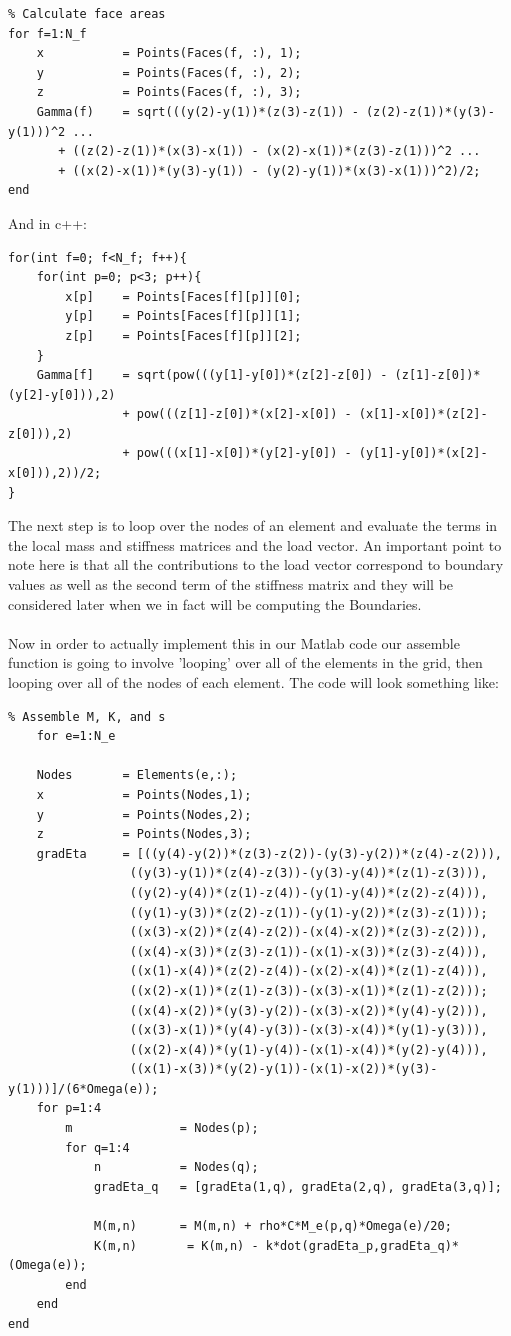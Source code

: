 \documentclass[12pt]{article}
\begin{document}
\begin{lstlisting}
% Calculate face areas
for f=1:N_f	
	x           = Points(Faces(f, :), 1);
	y           = Points(Faces(f, :), 2);
	z           = Points(Faces(f, :), 3);
	Gamma(f)	= sqrt(((y(2)-y(1))*(z(3)-z(1)) - (z(2)-z(1))*(y(3)-y(1)))^2 ... 
	   + ((z(2)-z(1))*(x(3)-x(1)) - (x(2)-x(1))*(z(3)-z(1)))^2 ...
	   + ((x(2)-x(1))*(y(3)-y(1)) - (y(2)-y(1))*(x(3)-x(1)))^2)/2;
end
\end{lstlisting}

And in c++:

\begin{lstlisting}[style=MyC++Style]
for(int f=0; f<N_f; f++){
	for(int p=0; p<3; p++){
		x[p]	= Points[Faces[f][p]][0];
		y[p]	= Points[Faces[f][p]][1];
		z[p]	= Points[Faces[f][p]][2];
	}
	Gamma[f]	= sqrt(pow(((y[1]-y[0])*(z[2]-z[0]) - (z[1]-z[0])*(y[2]-y[0])),2)
				+ pow(((z[1]-z[0])*(x[2]-x[0]) - (x[1]-x[0])*(z[2]-z[0])),2)
				+ pow(((x[1]-x[0])*(y[2]-y[0]) - (y[1]-y[0])*(x[2]-x[0])),2))/2;
}
\end{lstlisting}

The next step is to loop over the nodes of an element and evaluate the terms in the local mass and stiffness matrices and the load vector. An important point to note here is that all the contributions to the load vector correspond to boundary values as well as the second term of the stiffness matrix and they will be considered later when we in fact will be computing the Boundaries. \cite{Steve13}
\\\\
Now in order to actually implement this in our Matlab code our assemble function is going to involve 'looping' over all of
the elements in the grid, then looping over all of the nodes of each element. The code will look something like:

\begin{lstlisting}
% Assemble M, K, and s
    for e=1:N_e
	
	Nodes       = Elements(e,:);
	x           = Points(Nodes,1);
	y           = Points(Nodes,2);
	z           = Points(Nodes,3);
	gradEta  	= [((y(4)-y(2))*(z(3)-z(2))-(y(3)-y(2))*(z(4)-z(2))), 
				 ((y(3)-y(1))*(z(4)-z(3))-(y(3)-y(4))*(z(1)-z(3))), 
				 ((y(2)-y(4))*(z(1)-z(4))-(y(1)-y(4))*(z(2)-z(4))), 
				 ((y(1)-y(3))*(z(2)-z(1))-(y(1)-y(2))*(z(3)-z(1)));
				 ((x(3)-x(2))*(z(4)-z(2))-(x(4)-x(2))*(z(3)-z(2))), 
				 ((x(4)-x(3))*(z(3)-z(1))-(x(1)-x(3))*(z(3)-z(4))), 
				 ((x(1)-x(4))*(z(2)-z(4))-(x(2)-x(4))*(z(1)-z(4))), 
				 ((x(2)-x(1))*(z(1)-z(3))-(x(3)-x(1))*(z(1)-z(2)));
				 ((x(4)-x(2))*(y(3)-y(2))-(x(3)-x(2))*(y(4)-y(2))), 
				 ((x(3)-x(1))*(y(4)-y(3))-(x(3)-x(4))*(y(1)-y(3))), 
				 ((x(2)-x(4))*(y(1)-y(4))-(x(1)-x(4))*(y(2)-y(4))), 
				 ((x(1)-x(3))*(y(2)-y(1))-(x(1)-x(2))*(y(3)-y(1)))]/(6*Omega(e)); 
	for p=1:4
		m               = Nodes(p);
		for q=1:4 
			n           = Nodes(q);
			gradEta_q   = [gradEta(1,q), gradEta(2,q), gradEta(3,q)];
							
			M(m,n)      = M(m,n) + rho*C*M_e(p,q)*Omega(e)/20;
			K(m,n)       = K(m,n) - k*dot(gradEta_p,gradEta_q)*(Omega(e));
		end
	end
end
\end{lstlisting}
\end{document}
